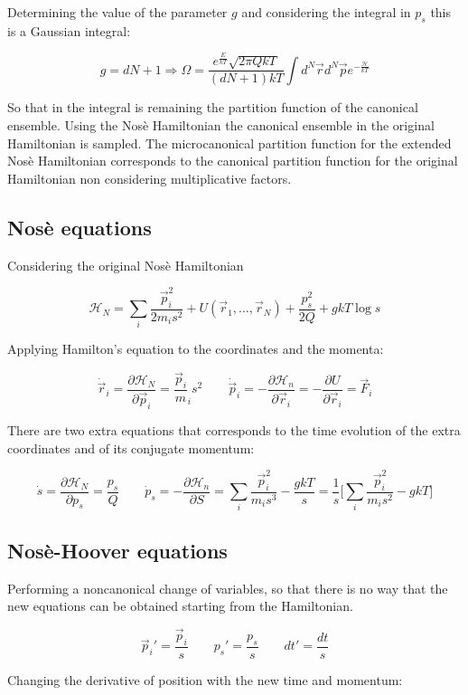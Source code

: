 Determining the value of the parameter $g$ and considering the integral in $p_s$ this is a Gaussian integral:

$$g = dN + 1\Rightarrow\Omega = \frac{e^{\frac{E}{kT}}\sqrt{2\pi QkT}}{(dN+1)kT}\int d^N\vec{r}d^N\vec{p}e^{-\frac{\mathcal{H}}{kT}}$$

So that in the integral is remaining the partition function of the canonical ensemble.
Using the Nos\`e Hamiltonian the canonical ensemble in the original Hamiltonian is sampled.
The microcanonical partition function for the extended Nos\`e Hamiltonian corresponds to the canonical partition function for the original Hamiltonian non considering multiplicative factors.

	\subsection{Nos\`e equations}
	Considering the original Nos\`e Hamiltonian

	$$\mathcal{H}_N = \sum\limits_i\frac{\vec{p}_i^2}{2m_is^2}+U(\vec{r}_1,\dots, \vec{r}_N) + \frac{p_s^2}{2Q} + gkT\log s$$

	Applying Hamilton's equation to the coordinates and the momenta:

	$$\dot{\vec{r}}_i = \frac{\partial\mathcal{H}_N}{\partial\vec{p}_i} = \frac{\vec{p}_i}m_is^2\qquad \dot{\vec{p}}_i = -\frac{\partial\mathcal{H}_n}{\partial\vec{r}_i} = -\frac{\partial U}{\partial\vec{r}_i} = \vec{F}_i$$

	There are two extra equations that corresponds to the time evolution of the extra coordinates and of its conjugate momentum:

	$$\dot{s} = \frac{\partial\mathcal{H}_N}{\partial p_s} = \frac{p_s}{Q}\qquad \dot{p}_s = -\frac{\partial\mathcal{H}_n}{\partial S} = \sum\limits_i\frac{\vec{p}_i^2}{m_is^3} - \frac{gkT}{s} = \frac{1}{s}\biggl[\sum\limits_i\frac{\vec{p}_i^2}{m_is^2}-gkT\biggr]$$

	\subsection{Nos\`e-Hoover equations}
	Performing a noncanonical change of variables, so that there is no way that the new equations can be obtained starting from the Hamiltonian.

	$$\vec{p}_i' = \frac{\vec{p}_i}{s}\qquad p_s' = \frac{p_s}{s}\qquad dt' = \frac{dt}{s}$$

	Changing the derivative of position with the new time and momentum:

